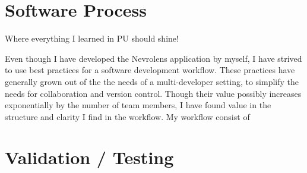 \section{Software Process}

\large{Where everything I learned in PU should shine!}

Even though I have developed the Nevrolens application by myself, I have strived to use best practices for a software development workflow. These practices have generally grown out of the the needs of a multi-developer setting, to simplify the needs for collaboration and version control. Though their value possibly increases exponentially by the number of team members, I have found value in the structure and clarity I find in the workflow. 
My workflow consist of 




\section{Validation / Testing}


